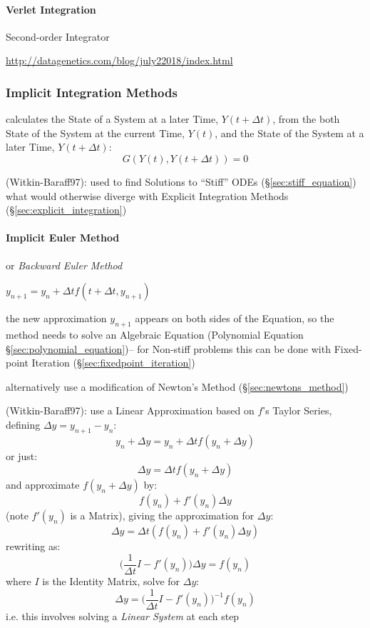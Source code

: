 \paragraph{Verlet Integration}\label{sec:verlet_integration}\hfill

Second-order Integrator

\url{http://datagenetics.com/blog/july22018/index.html}



\subsubsection{Implicit Integration Methods}\label{sec:implicit_integration}

calculates the State of a System at a later Time, $Y(t + \Delta{t})$, from the
both State of the System at the current Time, $Y(t)$, and the State of the
System at a later Time, $Y(t + \Delta{t})$:
\[
  G(Y(t), Y(t + \Delta{t})) = 0
\]

(Witkin-Baraff97): used to find Solutions to ``Stiff'' ODEs
(\S\ref{sec:stiff_equation}) what would otherwise diverge with Explicit
Integration Methods (\S\ref{sec:explicit_integration})



\paragraph{Implicit Euler Method}\label{sec:implicit_euler}\hfill

or \emph{Backward Euler Method}

$y_{n+1} = y_n + \Delta{t}f(t + \Delta{t}, y_{n+1})$

the new approximation $y_{n+1}$ appears on both sides of the Equation, so the
method needs to solve an Algebraic Equation (Polynomial Equation
\S\ref{sec:polynomial_equation})-- for Non-stiff problems this can be done with
Fixed-point Iteration (\S\ref{sec:fixedpoint_iteration})

alternatively use a modification of Newton's Method (\S\ref{sec:newtons_method})

(Witkin-Baraff97): use a Linear Approximation based on $f$'s Taylor Series,
defining $\Delta{y} = y_{n+1} - y_n$:
\[
  y_n + \Delta{y} = y_n + \Delta{t}f(y_n + \Delta{y})
\]
or just:
\[
  \Delta{y} = \Delta{t}f(y_n + \Delta{y})
\]
and approximate $f(y_n + \Delta{y})$ by:
\[
  f(y_n) + f'(y_n)\Delta{y}
\]
(note $f'(y_n)$ is a Matrix), giving the approximation for $\Delta{y}$:
\[
  \Delta{y} = \Delta{t}(f(y_n) + f'(y_n)\Delta{y})
\]
rewriting as:
\[
  \Big(\frac{1}{\Delta{t}}I - f'(y_n)\Big)\Delta{y} = f(y_n)
\]
where $I$ is the Identity Matrix, solve for $\Delta{y}$:
\[
  \Delta{y} = \Big(\frac{1}{\Delta{t}}I - f'(y_n)\Big)^{-1}f(y_n)
\]
i.e. this involves solving a \emph{Linear System} at each step



